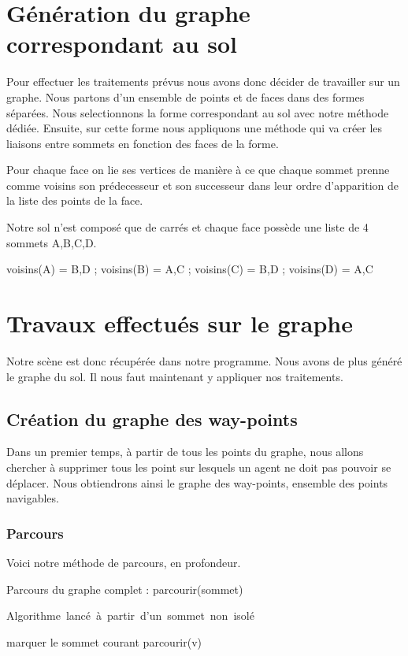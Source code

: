 \documentclass[a4paper,12pt]{report}
\begin{document}
\section{Génération du graphe correspondant au sol}

Pour effectuer les traitements prévus nous avons donc décider de travailler sur un graphe. Nous partons d'un ensemble de points et de faces dans des formes séparées. Nous selectionnons la forme correspondant au sol avec notre méthode dédiée. Ensuite, sur cette forme nous appliquons une méthode qui va créer les liaisons entre sommets en fonction des faces de la forme. 

Pour chaque face on lie ses vertices de manière à ce que chaque sommet prenne comme voisins son prédecesseur et son successeur dans leur ordre d'apparition de la liste des points de la face.

Notre sol n'est composé que de carrés et chaque face possède une liste de 4 sommets A,B,C,D.

voisins(A) = {B,D} ;  voisins(B) = {A,C} ; voisins(C) = {B,D} ; voisins(D) = {A,C}

\section{Travaux effectués sur le graphe}

Notre scène est donc récupérée dans notre programme. Nous avons de plus généré le graphe du sol. Il nous faut maintenant y appliquer nos traitements.

\subsection{Création du graphe des way-points}

Dans un premier temps, à partir de tous les points du graphe, nous allons chercher à supprimer tous les point sur lesquels un agent ne doit pas pouvoir se déplacer. Nous obtiendrons ainsi le graphe des way-points, ensemble des points navigables.

\subsubsection{Parcours}

Voici notre méthode de parcours, en profondeur. 

\begin{algorithm}[h]
\caption{Parcours du graphe complet : parcourir(sommet)}
\label{parcours_graphe}
\mbox{Algorithme lancé à partir d'un sommet non isolé}
\begin{algorithmic}[1]
  \STATE marquer le sommet courant
    \STATE parcourir(v)
  \ENDFOR
\ENDIF
\end{algorithmic}
\end{algorithm}
\end{document}
